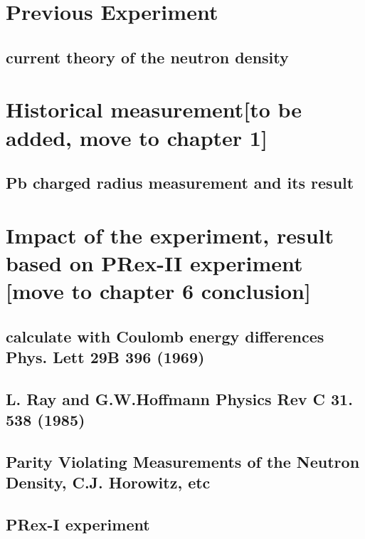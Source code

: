 \section{Previous Experiment}
\subsection{current theory of the neutron density}

\section{Historical measurement[to be added, move to chapter 1]}
\subsection{Pb charged radius measurement and its result }

\section{Impact of the experiment, result based on PRex-II experiment [move to chapter 6 conclusion]}

\subsection{calculate with Coulomb energy differences Phys. Lett 29B 396 (1969)}
\subsection{L. Ray and G.W.Hoffmann Physics Rev C 31. 538 (1985)}
\subsection{ Parity Violating Measurements of the Neutron Density, C.J. Horowitz, etc}
\subsection{PRex-I experiment}